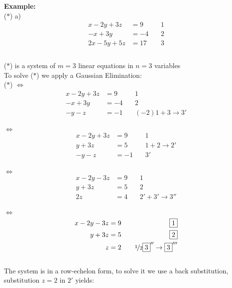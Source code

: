 \documentclass{jhwhw}
\begin{document}
\textbf{Example:}
\\

(\(\ast\)) a) \begin{align*} 
x-2y+3z&=9 \quad &\boxed{1}\\
-x+3y&=-4 \quad &\boxed{2} \\
2x-5y+5z&=17 \quad &\boxed{3} \\
\end{align*}
\\
(\(\ast\)) is a system of \(m=3\) linear equations in \(n=3\) variables
\\

To solve (\(\ast\)) we apply a Gaussian Elimination:
\\

(\(\ast\)) \(\Leftrightarrow\) \begin{align*} 
x-2y+3z&=9 \quad &\boxed{1} \\
-x+3y&=-4 \quad &\boxed{2} \\
-y-z&=-1 \quad &(-2)\boxed{1} + \boxed{3} \rightarrow \boxed{3}'
\end{align*}
\\

\(\Leftrightarrow\) \begin{align*} 
x-2y+3z&=9 \quad &\boxed{1}\\
y+3z&=5 \quad &\boxed{1} + \boxed{2} \rightarrow \boxed{2}'\\
-y-z&=-1 \quad &\boxed{3}'
\end{align*}
\\

\(\Leftrightarrow\) \begin{align*} 
x-2y-3z&=9 \quad &\boxed{1}\\
y+3z&=5 \quad &\boxed{2}\\
2z&=4 \quad &\boxed{2}' + \boxed{3}' \rightarrow \boxed{3}''
\end{align*}
\\

\(\Leftrightarrow\) \begin{align*} 
    x-2y-3z&=9 \quad &\boxed{1}\\
    y+3z&=5 \quad &\boxed{2}\\
    z&=2 \quad &\nicefrac{1}{2}\boxed{3}'' \rightarrow \boxed{3}'''
\end{align*}
\\

The system is in a row-echelon form, to solve it we use a back substitution, substitution \(z=2\) in \(\boxed{2}'\) yields:
\\
\end{document}
